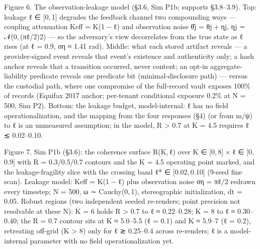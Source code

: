 \documentclass[
]{article}
\begin{document}
Figure 6. The observation-leakage model (§3.6, Sim P1b; supports
§3.8--3.9). Top: leakage {ℓ ∈ {[}0, 1{]}} degrades the feedback channel
two compounding ways --- coupling attenuation {Keff = K(1 − ℓ)} and
observation noise {θ̂j = θj + ηj}, {ηj ∼ 𝒩(0, (πℓ/2)2)} --- so the
adversary's view decorrelates from the true state as {ℓ} rises (at
{ℓ = 0.9}, {ση ≈ 1.41} rad). Middle: what each stored artifact reveals
--- a provider-signed event reveals that event's existence and
authenticity only; a hash anchor reveals that a transition occurred,
never content; an opt-in aggregate-liability predicate reveals one
predicate bit (minimal-disclosure path) --- versus the custodial path,
where one compromise of the full-record vault exposes 100\% of records
(Equifax 2017 anchor; per-tenant conditional exposure 0.2\% at
{N = 500}, Sim P2). Bottom: the leakage budget, model-internal: {ℓ} has
no field operationalization, and the mapping from the four responses
(§4) (or from {m}/{ψ}) to {ℓ} is an unmeasured assumption; in the model,
{R \textgreater{} 0.7} at {K = 4.5} requires {ℓ ≲ 0.02}--{0.10}.

Figure 7. Sim P1b (§3.6): the coherence surface {R(K, ℓ)} over
{K ∈ {[}0, 8{]} × ℓ ∈ {[}0, 0.9{]}} with {R = 0.3/0.5/0.7} contours and
the {K = 4.5} operating point marked, and the leakage-fragility slice
with the crossing band ℓ* ∈ {[}0.02, 0.10{]} (9-seed fine scan). Leakage
model: {Keff = K(1 − ℓ)} plus observation noise {ση = πℓ/2} redrawn
every timestep; {N = 500}, {ω ∼ Cauchy(0, 1)}, stereographic
initialization, {dt = 0.05}. Robust regions (two independent seeded
re-renders; point precision not resolvable at these N): {K = 6} holds
{R \textgreater{} 0.7} to {ℓ ≈ 0.22--0.28}; {K = 8} to {ℓ ≈ 0.30--0.40};
the {R = 0.7} contour sits at {K ≈ 5.0--5.5} ({ℓ = 0.1}) and
{K ≈ 5.9--7} ({ℓ = 0.2}), retreating off-grid ({K \textgreater{} 8})
only for {ℓ ≳ 0.25--0.4} across re-renders; {ℓ} is a model-internal
parameter with no field operationalization yet.
\end{document}
